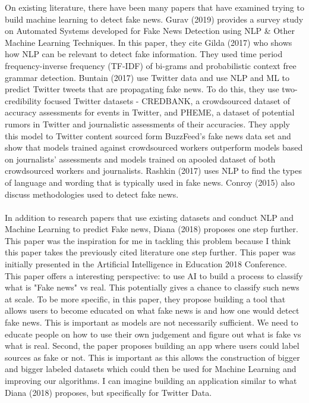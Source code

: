 \documentclass[12pt, final]{article}
\begin{document}
On existing literature, there have been many papers that have examined trying to build machine learning to detect fake news. Gurav (2019) \cite{Gurav} provides a survey study on Automated Systems developed for Fake News Detection using NLP \& Other Machine Learning Techniques. In this paper, they cite Gilda (2017) \cite{Gilda} who shows how NLP can be relevant to detect fake information. They used time period frequency-inverse frequency (TF-IDF) of bi-grams and probabilistic context free grammar detection. Buntain (2017) \cite{Buntain} use Twitter data and use NLP and ML to predict Twitter tweets that are propagating fake news. To do this, they use two-credibility focused Twitter datasets - CREDBANK, a crowdsourced dataset of accuracy assessments for events in Twitter, and PHEME, a dataset of potential rumors in Twitter and journalistic assessments of their accuracies. They apply this model to Twitter content sourced form BuzzFeed's fake news data set and show that models trained against crowdsourced workers outperform models based on journalists' assessments and models trained on apooled dataset of both crowdsourced workers and journalists. Rashkin (2017) \cite{Rashkin} uses NLP to find the types of language and wording that is typically used in fake news. Conroy (2015) \cite{Conroy} also discuss methodologies used to detect fake news.
\\
\\
In addition to research papers that use existing datasets and conduct NLP and Machine Learning to predict Fake news, Diana (2018)  \cite{Diana} proposes one step further. This paper was the inspiration for me in tackling this problem because I think this paper takes the previously cited literature one step further. This paper was initially presented in the Artificial Intelligence in Education 2018 Conference.  This paper offers a interesting perspective: to use AI to build a process to classify what is "Fake news" vs real. This potentially gives a chance to classify such news at scale. To be more specific, in this paper, they propose building a tool that allows users to become educated on what fake news is and how one would detect fake news. This is important as models are not necessarily sufficient. We need to educate people on how to use their own judgement and figure out what is fake vs what is real. Second, the paper proposes building an app where users could label sources as fake or not. This is important as this allows the construction of bigger and bigger labeled datasets which could then be used for Machine Learning and improving our algorithms. I can imagine building an application similar to what Diana (2018) \cite{Diana} proposes, but specifically for Twitter Data.
\end{document}
